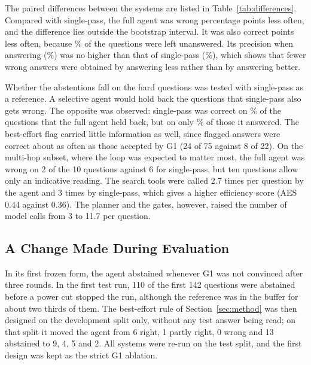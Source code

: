 The paired differences between the systems are listed in Table~\ref{tab:differences}.
Compared with single-pass, the full agent was wrong \nDiffWrongSP{} percentage points
less often, and the difference lies outside the bootstrap interval. It was also
correct \nDiffCorrectSP{} points less often, because \nFullAbstain\% of the questions
were left unanswered. Its precision when answering (\nFullPrec\%) was no higher than
that of single-pass (\nSPPrec\%), which shows that fewer wrong answers were obtained by
answering less rather than by answering better.

\begin{table}[!htb]
\centering
\caption{Paired differences in percentage points on the same questions
($^{*}$: the 95\% bootstrap interval excludes zero; MH: multi-hop subset)}
\label{tab:differences}
\footnotesize

\end{table}

Whether the abstentions fall on the hard questions was tested with single-pass as a
reference. A selective agent would hold back the questions that single-pass also gets
wrong. The opposite was observed: single-pass was correct on \nSelFullHeld\% of the
questions that the full agent held back, but on only \nSelFullAns\% of those it answered.
The best-effort flag carried little information as well, since flagged answers were
correct about as often as those accepted by G1 (24 of 75 against 8 of 22). On the
multi-hop subset, where the loop was expected to matter most, the full agent was wrong
on 2 of the 10 questions against 6 for single-pass, but ten questions allow only an
indicative reading. The search tools were called 2.7 times per question by the agent and
3 times by single-pass, which gives a higher efficiency score (AES 0.44 against 0.36).
The planner and the gates, however, raised the number of model calls from 3 to 11.7
per question.

\subsection{A Change Made During Evaluation}
\label{sec:best-effort}

In its first frozen form, the agent abstained whenever G1 was not convinced after three
rounds. In the first test run, 110 of the first 142 questions were abstained before a
power cut stopped the run, although the reference was in the buffer for about two
thirds of them. The best-effort rule of Section~\ref{sec:method} was then designed on
the development split only, without any test answer being read; on that split it
moved the agent from 6 right, 1 partly right, 0 wrong and 13 abstained to 9, 4, 5 and
2. All systems were re-run on the test split, and the first design was kept as the
strict G1 ablation.

